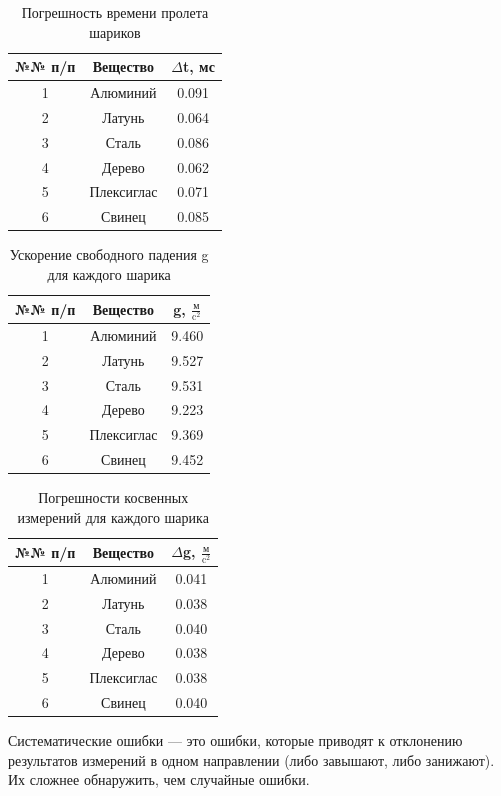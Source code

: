 \begin{center}
\begin{table}[h!]
\centering
\caption{Погрешность времени пролета шариков}
\label{tabl:3}
\begin{tabular}{|c|c|c|}
\hline
\begin{minipage}{1cm}
    №№ п/п
\end{minipage}
 & Вещество & $\Delta$t, мс \\
\hline
1 & Алюминий & 0.091\\
2 & Латунь & 0.064\\
3 & Сталь & 0.086\\
4 & Дерево & 0.062\\
5 & Плексиглас & 0.071\\
6 & Свинец & 0.085\\
\hline
\end{tabular}
\end{table}
\end{center}

\begin{center}
\begin{table}[h!]
\centering
\caption{Ускорение свободного падения g для каждого шарика}
\label{tabl:3}
\begin{tabular}{|c|c|c|}
\hline
\begin{minipage}{1cm}
    №№ п/п
\end{minipage}
 & Вещество & g, $\frac{\text{м}}{\text{c}^2}$ \\
\hline
1 & Алюминий & 9.460\\
2 & Латунь & 9.527\\
3 & Сталь & 9.531\\
4 & Дерево & 9.223\\
5 & Плексиглас & 9.369\\
6 & Свинец & 9.452\\
\hline
\end{tabular}
\end{table}
\end{center}

\begin{center}
\begin{table}[h!]
\centering
\caption{Погрешности косвенных измерений для
каждого шарика}
\label{tabl:5}
\begin{tabular}{|c|c|c|}
\hline
\begin{minipage}{1cm}
    №№ п/п
\end{minipage}
 & Вещество & $\Delta$g, $\frac{\text{м}}{\text{c}^2}$ \\
\hline
1 & Алюминий & 0.041\\
2 & Латунь & 0.038\\
3 & Сталь & 0.040\\
4 & Дерево & 0.038\\
5 & Плексиглас & 0.038\\
6 & Свинец & 0.040\\
\hline
\end{tabular}
\end{table}
\end{center}
Систематические ошибки — это ошибки, которые приводят к отклонению результатов измерений в одном направлении (либо завышают, либо занижают). Их сложнее обнаружить, чем случайные ошибки.

